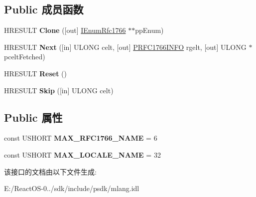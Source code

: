 \subsection*{Public 成员函数}
\begin{DoxyCompactItemize}
\item 
\mbox{\label{interface_multi_language_1_1_i_enum_rfc1766_a273b06a3222926c4053614f5f93d51dd}} 
H\+R\+E\+S\+U\+LT {\bfseries Clone} (\mbox{[}out\mbox{]} \hyperlink{interface_multi_language_1_1_i_enum_rfc1766}{I\+Enum\+Rfc1766} $\ast$$\ast$pp\+Enum)
\item 
\mbox{\label{interface_multi_language_1_1_i_enum_rfc1766_a3c408faedbec949b211b384db7abab39}} 
H\+R\+E\+S\+U\+LT {\bfseries Next} (\mbox{[}in\mbox{]} U\+L\+O\+NG celt, \mbox{[}out\mbox{]} \hyperlink{struct_multi_language_1_1_i_enum_rfc1766_1_1tag_r_f_c1766_i_n_f_o}{P\+R\+F\+C1766\+I\+N\+FO} rgelt, \mbox{[}out\mbox{]} U\+L\+O\+NG $\ast$pcelt\+Fetched)
\item 
\mbox{\label{interface_multi_language_1_1_i_enum_rfc1766_a853e9f807f6476d6b5e264e1a2e4d8aa}} 
H\+R\+E\+S\+U\+LT {\bfseries Reset} ()
\item 
\mbox{\label{interface_multi_language_1_1_i_enum_rfc1766_a0091a3f880892cbf3392535f63fc3113}} 
H\+R\+E\+S\+U\+LT {\bfseries Skip} (\mbox{[}in\mbox{]} U\+L\+O\+NG celt)
\end{DoxyCompactItemize}
\subsection*{Public 属性}
\begin{DoxyCompactItemize}
\item 
\mbox{\label{interface_multi_language_1_1_i_enum_rfc1766_a5f68c5da5fa21d3486d106f4a96ab556}} 
const U\+S\+H\+O\+RT {\bfseries M\+A\+X\+\_\+\+R\+F\+C1766\+\_\+\+N\+A\+ME} = 6
\item 
\mbox{\label{interface_multi_language_1_1_i_enum_rfc1766_a3268d7abb9442b3d0c20bb876c98900e}} 
const U\+S\+H\+O\+RT {\bfseries M\+A\+X\+\_\+\+L\+O\+C\+A\+L\+E\+\_\+\+N\+A\+ME} = 32
\end{DoxyCompactItemize}


该接口的文档由以下文件生成\+:\begin{DoxyCompactItemize}
\item 
E\+:/\+React\+O\+S-\/0../sdk/include/psdk/mlang.\+idl\end{DoxyCompactItemize}
